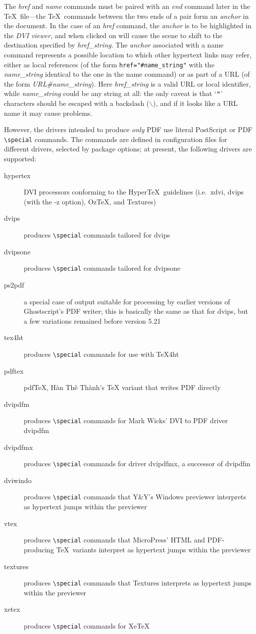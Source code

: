 \documentclass[pdftex]{article}
\def\Hanh{H\`an Th\^e\llap{\raise 0.5ex\hbox{\'{}}} Th\`anh}
\begin{document}
The \emph{href} and \emph{name} commands must be paired with an
\emph{end} command later in the \TeX\ file---the \TeX\ commands between
the two ends of a pair form an \emph{anchor} in the document. In the
case of an \emph{href} command, the \emph{anchor} is to be highlighted
in the \emph{DVI viewer}, and when clicked on will cause the scene to
shift to the destination specified by \emph{href\_string}. The
\emph{anchor} associated with a name command represents a possible
location to which other hypertext links may refer, either as local
references (of the form \verb|href="#name_string"| with the
\emph{name\_string} identical to the one in the name command) or as part
of a URL (of the form \emph{URL\#name\_string}). Here
\emph{href\_string} is a valid URL or local identifier, while
\emph{name\_string} could be any string at all: the only caveat is that
`$\verb|"|$' characters should be escaped with a backslash
($\backslash$), and if it looks like a URL name it may cause problems.

However, the drivers intended to produce \emph{only} PDF use literal
PostScript or PDF \verb|\special| commands. The commands are defined in
configuration files for different drivers, selected by package options;
at present, the following drivers are supported:

\begin{description}
\item[hypertex] DVI processors conforming to the Hyper\TeX\ guidelines (i.e.\ \textsf{xdvi}, \textsf{dvips} (with
the \textsf{-z} option), \textsf{OzTeX}, and \textsf{Textures})
\item[dvips] produces \verb|\special| commands tailored for \textsf{dvips}
\item[dvipsone] produces \verb|\special| commands tailored for \textsf{dvipsone}
\item[ps2pdf] a special case of output suitable for processing by earlier versions of Ghost\-script's
PDF writer; this is basically the same as that for \textsf{dvips}, but a few variations remained before version 5.21
\item[tex4ht] produces \verb|\special| commands for use with \textsf{\TeX4ht}
\item[pdftex] pdf\TeX, \Hanh{}'s \TeX{} variant that writes PDF directly
\item[dvipdfm] produces \verb|\special| commands for Mark Wicks' DVI to PDF driver \textsf{dvipdfm}
\item[dvipdfmx] produces \verb|\special| commands for driver
     \textsf{dvipdfmx}, a successor of \textsf{dvipdfm}
\item[dviwindo] produces \verb|\special| commands that Y\&Y's Windows previewer interprets as hypertext jumps within the previewer
\item[vtex] produces \verb|\special| commands that MicroPress' HTML and
     PDF-producing \TeX\ variants interpret as hypertext jumps within the
     previewer
\item[textures] produces \verb|\special| commands that \textsf{Textures} interprets as hypertext jumps within the previewer
\item[xetex] produces \verb|\special| commands for Xe\TeX{}
\end{description}
\end{document}
